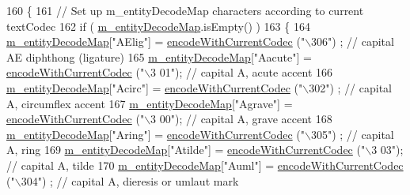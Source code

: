 \begin{DoxyCode}
160 \{
161     \textcolor{comment}{// Set up m\_entityDecodeMap characters according to current textCodec}
162     \textcolor{keywordflow}{if} ( \hyperlink{classLCHMFileImpl_ae00b1b33fde26e719bc22207c11e589f}{m\_entityDecodeMap}.isEmpty() )
163     \{
164         \hyperlink{classLCHMFileImpl_ae00b1b33fde26e719bc22207c11e589f}{m\_entityDecodeMap}[\textcolor{stringliteral}{"AElig"}] = \hyperlink{classLCHMFileImpl_a6f8c407b1fbbe568df1690b3d2edee91}{encodeWithCurrentCodec} (\textcolor{stringliteral}{"\(\backslash\)306"})
      ; \textcolor{comment}{// capital AE diphthong (ligature)}
165         \hyperlink{classLCHMFileImpl_ae00b1b33fde26e719bc22207c11e589f}{m\_entityDecodeMap}[\textcolor{stringliteral}{"Aacute"}]    = \hyperlink{classLCHMFileImpl_a6f8c407b1fbbe568df1690b3d2edee91}{encodeWithCurrentCodec} (\textcolor{stringliteral}{"\(\backslash\)3
      01"}); \textcolor{comment}{// capital A, acute accent}
166         \hyperlink{classLCHMFileImpl_ae00b1b33fde26e719bc22207c11e589f}{m\_entityDecodeMap}[\textcolor{stringliteral}{"Acirc"}] = \hyperlink{classLCHMFileImpl_a6f8c407b1fbbe568df1690b3d2edee91}{encodeWithCurrentCodec} (\textcolor{stringliteral}{"\(\backslash\)302"})
      ; \textcolor{comment}{// capital A, circumflex accent}
167         \hyperlink{classLCHMFileImpl_ae00b1b33fde26e719bc22207c11e589f}{m\_entityDecodeMap}[\textcolor{stringliteral}{"Agrave"}]    = \hyperlink{classLCHMFileImpl_a6f8c407b1fbbe568df1690b3d2edee91}{encodeWithCurrentCodec} (\textcolor{stringliteral}{"\(\backslash\)3
      00"}); \textcolor{comment}{// capital A, grave accent}
168         \hyperlink{classLCHMFileImpl_ae00b1b33fde26e719bc22207c11e589f}{m\_entityDecodeMap}[\textcolor{stringliteral}{"Aring"}] = \hyperlink{classLCHMFileImpl_a6f8c407b1fbbe568df1690b3d2edee91}{encodeWithCurrentCodec} (\textcolor{stringliteral}{"\(\backslash\)305"})
      ; \textcolor{comment}{// capital A, ring}
169         \hyperlink{classLCHMFileImpl_ae00b1b33fde26e719bc22207c11e589f}{m\_entityDecodeMap}[\textcolor{stringliteral}{"Atilde"}]    = \hyperlink{classLCHMFileImpl_a6f8c407b1fbbe568df1690b3d2edee91}{encodeWithCurrentCodec} (\textcolor{stringliteral}{"\(\backslash\)3
      03"}); \textcolor{comment}{// capital A, tilde}
170         \hyperlink{classLCHMFileImpl_ae00b1b33fde26e719bc22207c11e589f}{m\_entityDecodeMap}[\textcolor{stringliteral}{"Auml"}]  = \hyperlink{classLCHMFileImpl_a6f8c407b1fbbe568df1690b3d2edee91}{encodeWithCurrentCodec} (\textcolor{stringliteral}{"\(\backslash\)304"})
      ; \textcolor{comment}{// capital A, dieresis or umlaut mark}

\end{DoxyCode}
